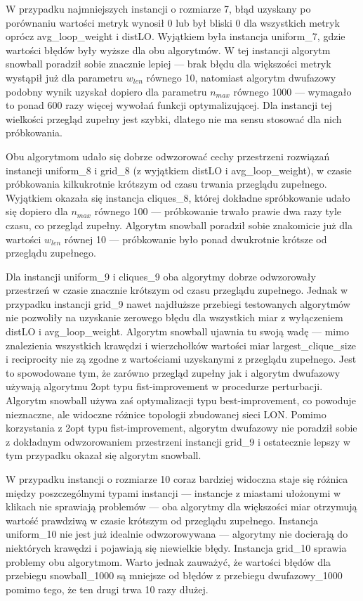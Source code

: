 W przypadku najmniejszych instancji o rozmiarze 7, błąd uzyskany po porównaniu wartości metryk
wynosił 0 lub był bliski 0 dla wszystkich metryk oprócz avg\_loop\_weight i distLO.
Wyjątkiem była instancja uniform\_7, gdzie wartości błędów były wyższe dla obu algorytmów.
W tej instancji algorytm snowball poradził sobie znacznie lepiej --- brak błędu dla większości
metryk wystąpił już dla parametru $w_{len}$ równego 10, natomiast algorytm dwufazowy
podobny wynik uzyskał dopiero dla parametru $n_{max}$ równego 1000 --- wymagało to ponad 600 razy więcej wywołań funkcji optymalizującej.
Dla instancji tej wielkości przegląd zupełny jest szybki, dlatego nie ma sensu stosować dla nich próbkowania.

Obu algorytmom udało się dobrze odwzorować cechy przestrzeni rozwiązań instancji uniform\_8 i grid\_8 (z wyjątkiem distLO i avg\_loop\_weight),
w czasie próbkowania kilkukrotnie krótszym od czasu trwania przeglądu zupełnego. Wyjątkiem okazała się instancja cliques\_8, której dokładne spróbkowanie
udało się dopiero dla $n_{max}$ równego 100 --- próbkowanie trwało prawie dwa razy tyle czasu, co przegląd zupełny.
Algorytm snowball poradził sobie znakomicie już dla wartości $w_{len}$ równej 10 --- próbkowanie było ponad dwukrotnie krótsze od przeglądu zupełnego.

Dla instancji uniform\_9 i cliques\_9 oba algorytmy dobrze odwzorowały przestrzeń w czasie znacznie krótszym od czasu przeglądu zupełnego.
Jednak w przypadku instancji grid\_9 nawet najdłuższe przebiegi testowanych algorytmów nie pozwoliły na uzyskanie zerowego błędu dla wszystkich
miar z wyłączeniem distLO i avg\_loop\_weight.
Algorytm snowball ujawnia tu swoją wadę --- mimo znalezienia wszystkich krawędzi i wierzchołków wartości miar largest\_clique\_size i reciprocity
nie zą zgodne z wartościami uzyskanymi z przeglądu zupełnego. Jest to spowodowane tym, że zarówno przegląd zupełny jak i algorytm dwufazowy używają
algorytmu 2opt typu fist-improvement w procedurze perturbacji. Algorytm snowball używa zaś optymalizacji typu best-improvement, co powoduje nieznaczne,
ale widoczne różnice topologii zbudowanej sieci LON.
Pomimo korzystania z 2opt typu fist-improvement, algorytm dwufazowy nie poradził sobie z dokładnym odwzorowaniem przestrzeni instancji grid\_9 i ostatecznie
lepszy w tym przypadku okazał się algorytm snowball.

W przypadku instancji o rozmiarze 10 coraz bardziej widoczna staje się różnica między poszczególnymi typami instancji --- instancje z miastami
ułożonymi w klikach nie sprawiają problemów --- oba algorytmy dla większości miar otrzymują wartość prawdziwą w czasie krótszym od przeglądu zupełnego.
Instancja uniform\_10 nie jest już idealnie odwzorowywana --- algorytmy nie docierają do niektórych krawędzi i pojawiają się niewielkie błędy.
Instancja grid\_10 sprawia problemy obu algorytmom. Warto jednak zauważyć, że wartości błędów dla przebiegu snowball\_1000 są mniejsze od błędów
z przebiegu dwufazowy\_1000 pomimo tego, że ten drugi trwa 10 razy dłużej.


